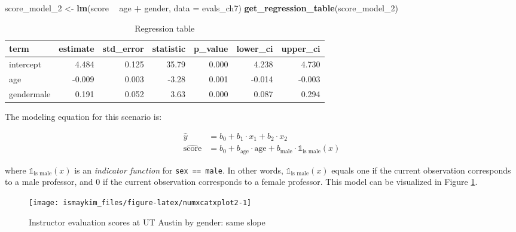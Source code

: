 \documentclass[12pt,]{krantz}
\makeatletter
\newenvironment{Shaded}{\begin{snugshade}}{\end{snugshade}}
\newcommand{\KeywordTok}[1]{\textcolor[rgb]{0.27,0.27,0.27}{\textbf{#1}}}
\newcommand{\DataTypeTok}[1]{\textcolor[rgb]{0.27,0.27,0.27}{#1}}
\newcommand{\DecValTok}[1]{\textcolor[rgb]{0.06,0.06,0.06}{#1}}
\newcommand{\StringTok}[1]{\textcolor[rgb]{0.5,0.5,0.5}{#1}}
\newcommand{\OperatorTok}[1]{\textcolor[rgb]{0.43,0.43,0.43}{\textbf{#1}}}
\newcommand{\NormalTok}[1]{#1}
\newenvironment{kframe}{%
\medskip{}
\setlength{\fboxsep}{.8em}
 \def\at@end@of@kframe{}%
 \ifinner\ifhmode%
  \def\at@end@of@kframe{\end{minipage}}%
  \begin{minipage}{\columnwidth}%
 \fi\fi%
 \def\FrameCommand##1{\hskip\@totalleftmargin \hskip-\fboxsep
 \colorbox{shadecolor}{##1}\hskip-\fboxsep
     \hskip-\linewidth \hskip-\@totalleftmargin \hskip\columnwidth}%
 \MakeFramed {\advance\hsize-\width
   \@totalleftmargin\z@ \linewidth\hsize
   \@setminipage}}%
 {\par\unskip\endMakeFramed%
 \at@end@of@kframe}
\renewenvironment{Shaded}{\begin{kframe}}{\end{kframe}}
\theoremstyle{definition}
\theoremstyle{definition}
\theoremstyle{definition}
\theoremstyle{remark}
\makeatother
\begin{document}
\begin{Shaded}
\begin{Highlighting}[]
\NormalTok{score_model_}\DecValTok{2}\NormalTok{ <-}\StringTok{ }\KeywordTok{lm}\NormalTok{(score }\OperatorTok{~}\StringTok{ }\NormalTok{age }\OperatorTok{+}\StringTok{ }\NormalTok{gender, }\DataTypeTok{data =}\NormalTok{ evals_ch7)}
\KeywordTok{get_regression_table}\NormalTok{(score_model_}\DecValTok{2}\NormalTok{)}
\end{Highlighting}
\end{Shaded}

\begin{table}[H]

\caption{\label{tab:unnamed-chunk-246}Regression table}
\centering
\fontsize{10}{12}\selectfont
\begin{tabular}[t]{lrrrrrr}
\toprule
term & estimate & std\_error & statistic & p\_value & lower\_ci & upper\_ci\\
\midrule
intercept & 4.484 & 0.125 & 35.79 & 0.000 & 4.238 & 4.730\\
age & -0.009 & 0.003 & -3.28 & 0.001 & -0.014 & -0.003\\
gendermale & 0.191 & 0.052 & 3.63 & 0.000 & 0.087 & 0.294\\
\bottomrule
\end{tabular}
\end{table}

The modeling equation for this scenario is:

\begin{align}
\widehat{y} &= b_0 + b_1 \cdot x_1 + b_2 \cdot x_2 \\
\widehat{\mbox{score}} &= b_0 + b_{\mbox{age}} \cdot \mbox{age} + b_{\mbox{male}} \cdot \mathbb{1}_{\mbox{is male}}(x)
\end{align}

where \(\mathbb{1}_{\mbox{is male}}(x)\) is an \emph{indicator function}
for \texttt{sex\ ==\ male}. In other words,
\(\mathbb{1}_{\mbox{is male}}(x)\) equals one if the current observation
corresponds to a male professor, and 0 if the current observation
corresponds to a female professor. This model can be visualized in
Figure \ref{fig:numxcatxplot2}.

\begin{figure}

{\centering \texttt{[image: ismaykim\_files/figure-latex/numxcatxplot2-1]} 

}

\caption{Instructor evaluation scores at UT Austin by gender: same slope}\label{fig:numxcatxplot2}
\end{figure}
\end{document}
